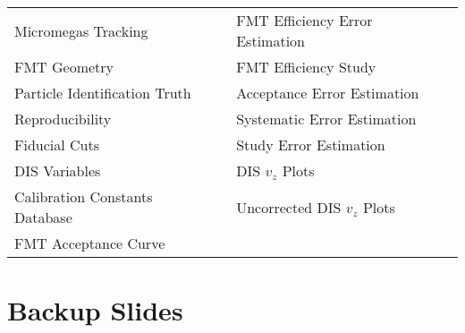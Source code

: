 \section*{}
\begin{frame}{}

    \begin{center}
        \begin{tabularx}{370pt}{p{150pt}X|p{150pt}X}
            Micromegas Tracking             & \epurple{\ref{20.01::micromegas_tracking}}             &
            FMT Efficiency Error Estimation & \epurple{\ref{20.09::fmt_efficiency_error_estimation}} \\
            FMT Geometry                    & \epurple{\ref{20.02::fmt_geometry}}                    &
            FMT Efficiency Study            & \epurple{\ref{20.10::fmt_efficiency_study}}            \\
            Particle Identification Truth   & \epurple{\ref{20.03::particle_identification_truth}}   &
            Acceptance Error Estimation     & \epurple{\ref{20.11::acceptance_error_estimation}}     \\
            Reproducibility                 & \epurple{\ref{20.04::reproducibility}}                 &
            Systematic Error Estimation     & \epurple{\ref{20.12::systematic_error_estimation}}     \\
            Fiducial Cuts                   & \epurple{\ref{20.05::fiducial_cuts}}                   &
            Study Error Estimation          & \epurple{\ref{20.13::study_error_estimation}}          \\
            DIS Variables                   & \epurple{\ref{20.06::dis_variables}}                   &
            DIS $v_z$ Plots                 & \epurple{\ref{20.14a::q2}}                             \\
            Calibration Constants Database  & \epurple{\ref{20.07::ccdb}}                            &
            Uncorrected DIS $v_z$ Plots     & \epurple{\ref{20.15a::q2}}                             \\
            FMT Acceptance Curve            & \epurple{\ref{20.08::fmt_acceptance_curve}}            & &
        \end{tabularx}
    \end{center}
\end{frame}

\section*{Backup Slides}
